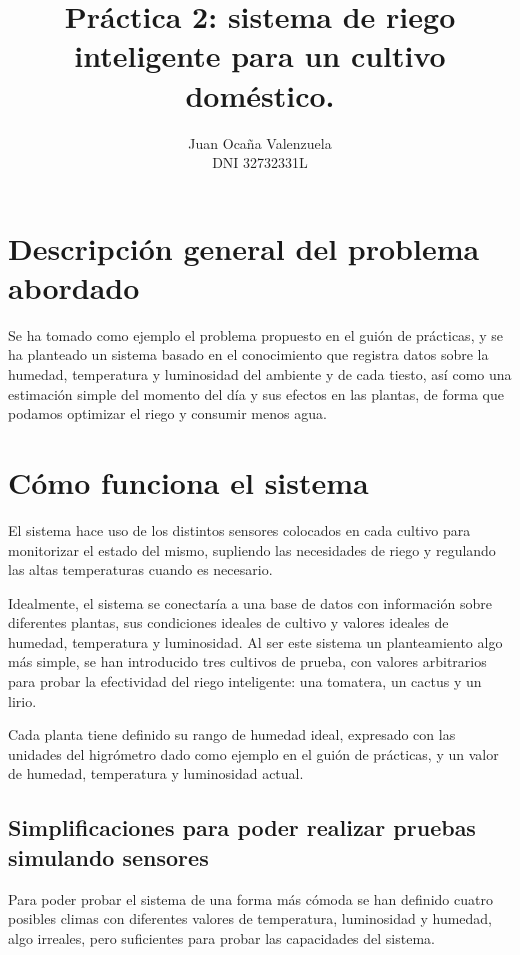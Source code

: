 \documentclass[11pt,a4paper]{article}
\author{Juan Ocaña Valenzuela \\ DNI 32732331L}
\title{\textbf{Práctica 2: sistema de riego inteligente para un cultivo doméstico.}}
\begin{document}
\thispagestyle{empty}

\maketitle

\newpage

\tableofcontents

\newpage

\section{Descripción general del problema abordado}
Se ha tomado como ejemplo el problema propuesto en el guión de prácticas, y se ha planteado un sistema basado en el conocimiento
que registra datos sobre la humedad, temperatura y luminosidad del ambiente y de cada tiesto, así como una estimación simple
del momento del día y sus efectos en las plantas, de forma que podamos optimizar el riego y consumir menos agua.

\section{Cómo funciona el sistema}
El sistema hace uso de los distintos sensores colocados en cada cultivo para monitorizar el estado del mismo, supliendo las necesidades de riego y regulando las altas temperaturas cuando es necesario.

Idealmente, el sistema se conectaría a una base de datos con información sobre diferentes plantas, sus condiciones ideales de cultivo y valores ideales de humedad, temperatura y luminosidad. Al ser este sistema un planteamiento algo más simple, se han introducido tres cultivos de prueba, con valores arbitrarios para probar la efectividad del riego inteligente: una tomatera, un cactus y un lirio.

Cada planta tiene definido su rango de humedad ideal, expresado con las unidades del higrómetro dado como ejemplo en el guión de prácticas, y un valor de humedad, temperatura y luminosidad actual.

\subsection{Simplificaciones para poder realizar pruebas simulando sensores}
Para poder probar el sistema de una forma más cómoda se han definido cuatro posibles climas con diferentes valores de temperatura, luminosidad y humedad, algo irreales, pero suficientes para probar las capacidades del sistema. 
\end{document}
